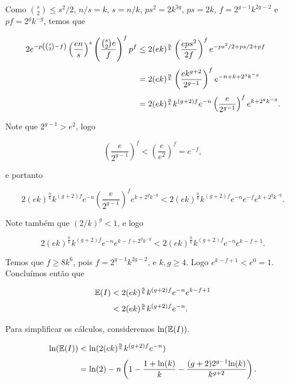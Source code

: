 Como $\binom{s}{2} \leq s^2/2$, $n/s = k$, $s = n/k$, $ps^2 = 2k^{3g}$, $ps = 2k$, $f = 2^{g-1}k^{2g-2}$ e $pf = 2^g k^{-g}$, temos que

\begin{equation*}
\setlength{\jot}{6pt}
\begin{aligned}
2e^{-p\left(\binom{s}{2}-f\right)}\left(\frac{en}{s}\right)^s\left(\frac{\binom{s}{2}e}{f}\right)^f p^f &\leq 2(ek)^{\frac{n}{k}}\left(\frac{eps^2}{2f}\right)^f e^{-ps^2/2+ps/2+pf} \\
&= 2(ek)^{\frac{n}{k}} \left(\frac{ek^{g+2}}{2^{g-1}}\right)^f e^{-n+k+2^{g}k^{-g}} \\
&= 2(ek)^{\frac{n}{k}} k^{(g+2)f} e^{-n} \left(\frac{e}{2^{g-1}}\right)^f e^{k+2^g k^{-g}}.
\end{aligned}
\end{equation*}

Note que $2^{g-1} > e^2$, logo

\[\left(\frac{e}{2^{g-1}}\right)^f < \left(\frac{e}{e^2}\right)^f = e^{-f},\]

e portanto

\[2(ek)^{\frac{n}{k}} k^{(g+2)f} e^{-n} \left(\frac{e}{2^{g-1}}\right)^f e^{k+2^g k^{-g}} < 2(ek)^{\frac{n}{k}} k^{(g+2)f} e^{-n} e^{-f} e^{k+2^g k^{-g}}.\]

Note também que $(2/k)^g < 1$, e logo

\[2(ek)^{\frac{n}{k}} k^{(g+2)f} e^{-n} e^{k-f+2^g k^{-g}} < 2(ek)^{\frac{n}{k}} k^{(g+2)f} e^{-n} e^{k-f+1}.\]

Temos que $f \geq 8k^6$, pois $f = 2^{g-1}k^{2g-2}$, e $k,g \geq 4$. Logo $e^{k-f+1} < e^0 = 1$. Concluímos então que

\begin{equation*}
\setlength{\jot}{6pt}
\begin{aligned}
\bbe(I) &< 2(ek)^{\frac{n}{k}} k^{(g+2)f} e^{-n} e^{k-f+1} \\ 
&< 2(ek)^{\frac{n}{k}}k^{(g+2)f}e^{-n}.
\end{aligned}
\end{equation*}

Para simplificar os cálculos, consideremos $\text{ln}(\mathbb{E}(I))$.

\begin{equation*}
\setlength{\jot}{6pt}
\begin{aligned}
\text{ln}(\bbe(I)) &< \text{ln}(2(ek)^{\frac{n}{k}}k^{(g+2)f}e^{-n})\\
&= \text{ln}(2) -n\left(1 - \frac{1+\text{ln}(k)}{k} - \frac{(g+2)2^{g-1} \text{ln}(k)}{k^{g+2}}\right).
\end{aligned}
\end{equation*}

